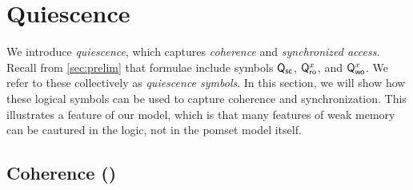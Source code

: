 \section{Quiescence}
\label{sec:q}

We introduce \emph{quiescence}, which captures \emph{coherence} and
\emph{synchronized access}.  Recall from
\textsection\ref{sec:prelim} that formulae include
symbols $\mathsf{Q}_{{\mathsf{sc}}}$, $\mathsf{Q}_{\mathsf{ro}}^{x}$, and $\mathsf{Q}_{\mathsf{wo}}^{x}$.
We refer to these collectively as \emph{quiescence symbols}.
In this section, we will show how these logical symbols can be used
to capture coherence and synchronization. This illustrates a feature
of our model, which is that many features of weak memory can be cautured
in the logic, not in the pomset model itself.

\subsection{Coherence (\xCO)}
\label{sec:co}

